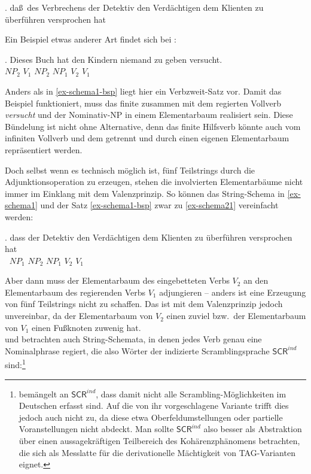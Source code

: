 \ex. da\ss \ des Verbrechens der Detektiv den Verdächtigen dem Klienten zu überführen versprochen hat \label{ex-schema1-bsp} \citep[(2b)]{Becker:Joshi:Rambow:91}

Ein Beispiel etwas anderer Art findet sich bei \cite{Rambow:94}:

\exg. {Dieses Buch} hat {den Kindern} niemand {zu geben} versucht.  \\
$\mathit{NP}_2$ $V_1$ $\mathit{NP}_2$ $\mathit{NP}_1$ $V_2$ $V_1$ \\
\citep[42]{Rambow:94} \label{ex-schema2}

Anders als in \ref{ex-schema1-bsp} liegt hier ein Verbzweit-Satz vor. Damit das Beispiel funktioniert, muss das finite  zusammen mit dem regierten Vollverb {\it versucht} und der Nominativ-NP in einem Elementarbaum realisiert sein. Diese Bündelung ist nicht ohne Alternative, denn das finite Hilfsverb könnte auch vom infiniten Vollverb und dem  getrennt und durch einen eigenen Elementarbaum repräsentiert werden. 

Doch selbst wenn es technisch möglich ist, fünf Teilstrings durch die Adjunktionsoperation zu erzeugen, stehen die involvierten Elementarbäume nicht immer im Einklang mit dem Valenzprinzip. So können das String-Schema in \ref{ex-schema1} und der Satz \ref{ex-schema1-bsp} zwar zu \ref{ex-schema21} vereinfacht werden: 

\exg. dass {der Detektiv} {den Verdächtigen} {dem Klienten} {zu überführen} {versprochen hat}  \\
$~$ $\mathit{NP}_1$ $\mathit{NP}_2$ $\mathit{NP}_1$ $V_2$ $V_1$ \\
\label{ex-schema21}

Aber dann muss der Elementarbaum des eingebetteten Verbs $V_2$ an den Elementarbaum des regierenden Verbs $V_1$ adjungieren -- anders ist eine Erzeugung von fünf Teilstrings nicht zu schaffen. Das ist mit dem Valenzprinzip jedoch unvereinbar, da der Elementarbaum von $V_2$ einen  zuviel bzw.\ der Elementarbaum von $V_1$ einen Fu\ss knoten zuwenig hat.  \\

\cite{Becker:Joshi:Rambow:91} und \cite{Joshi:Becker:Rambow:00} betrachten auch String-Schemata, in denen jedes Verb genau eine Nominalphrase regiert, die also Wörter der indizierte Scramblingsprache $\mathsf{SCR}^{ind}$ sind:\footnote{\citet[200]{Kallmeyer:05} bemängelt an  $\mathsf{SCR}^{ind}$, dass damit nicht alle Scrambling-Möglichkeiten im Deutschen erfasst sind. Auf die von ihr vorgeschlagene Variante trifft dies jedoch auch nicht zu, da diese etwa Oberfeldumstellungen oder partielle Voranstellungen nicht abdeckt. Man sollte $\mathsf{SCR}^{ind}$ also besser als Abstraktion über einen aussagekräftigen Teilbereich des Kohärenzphänomens betrachten, die sich als Messlatte für die derivationelle Mächtigkeit von TAG-Varianten eignet.}

